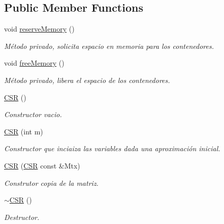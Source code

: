 \subsection*{Public Member Functions}
\begin{DoxyCompactItemize}
\item 
void \hyperlink{class_c_s_r_a5c5d4c602abb10f64bbabbdede9fdb11}{reserve\+Memory} ()
\begin{DoxyCompactList}\small\item\em Método privado, solicita espacio en memoria para los contenedores. \end{DoxyCompactList}\item 
void \hyperlink{class_c_s_r_a113b4ec55800f1e6e447deff6cdc5352}{free\+Memory} ()
\begin{DoxyCompactList}\small\item\em Método privado, libera el espacio de los contenedores. \end{DoxyCompactList}\item 
\hypertarget{class_c_s_r_a146e641d1de73e4094af65c9ee995a12}{}\label{class_c_s_r_a146e641d1de73e4094af65c9ee995a12} 
\hyperlink{class_c_s_r_a146e641d1de73e4094af65c9ee995a12}{C\+SR} ()
\begin{DoxyCompactList}\small\item\em Constructor vacio. \end{DoxyCompactList}\item 
\hyperlink{class_c_s_r_a0baa0913a803243656231d2f699285ff}{C\+SR} (int m)
\begin{DoxyCompactList}\small\item\em Constructor que inciaiza las variables dada una aproximación inicial. \end{DoxyCompactList}\item 
\hypertarget{class_c_s_r_a90748f871ae00f2ef71ab6fc116ab890}{}\label{class_c_s_r_a90748f871ae00f2ef71ab6fc116ab890} 
\hyperlink{class_c_s_r_a90748f871ae00f2ef71ab6fc116ab890}{C\+SR} (\hyperlink{class_c_s_r}{C\+SR} const \&Mtx)
\begin{DoxyCompactList}\small\item\em Construtor copia de la matriz. \end{DoxyCompactList}\item 
\hypertarget{class_c_s_r_a9541497983141b88c62ff26a18721391}{}\label{class_c_s_r_a9541497983141b88c62ff26a18721391} 
\hyperlink{class_c_s_r_a9541497983141b88c62ff26a18721391}{$\sim$\+C\+SR} ()
\begin{DoxyCompactList}\small\item\em Destructor. \end{DoxyCompactList}\item 

\end{DoxyCompactItemize}
